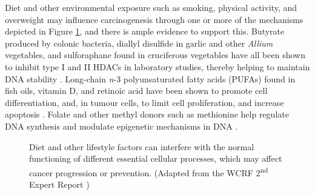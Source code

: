 \noindent Diet and other environmental exposure such as smoking, physical activity, and overweight may influence carcinogenesis through one or more of the mechanisms depicted in Figure \ref{figure2_1}, and there is ample evidence to support this. Butyrate produced by colonic bacteria, diallyl disulfide in garlic and other \emph{Allium} vegetables, and sulforaphane found in cruciferous vegetables have all been shown to inhibit type I and II HDACs in laboratory studies, thereby helping to maintain DNA stability \cite{c211}. Long-chain \emph{n}-3 polyunsaturated fatty acids (PUFAs) found in fish oils, vitamin D, and retinoic acid have been shown to promote cell differentiation, and, in tumour cells, to limit cell proliferation, and increase apoptosis \cite{c212,c213,c214}. Folate and other methyl donors such as methionine help regulate DNA synthesis and modulate epigenetic mechanisms in DNA \cite{c214}.

\begin{figure} 
\caption{Diet and other lifestyle factors can interfere with the normal functioning of different essential cellular processes, which may affect cancer progression or prevention. (Adapted from the WCRF 2\textsuperscript{nd} Expert Report \cite{c214})}
\label{figure2_1} 
\end{figure}

